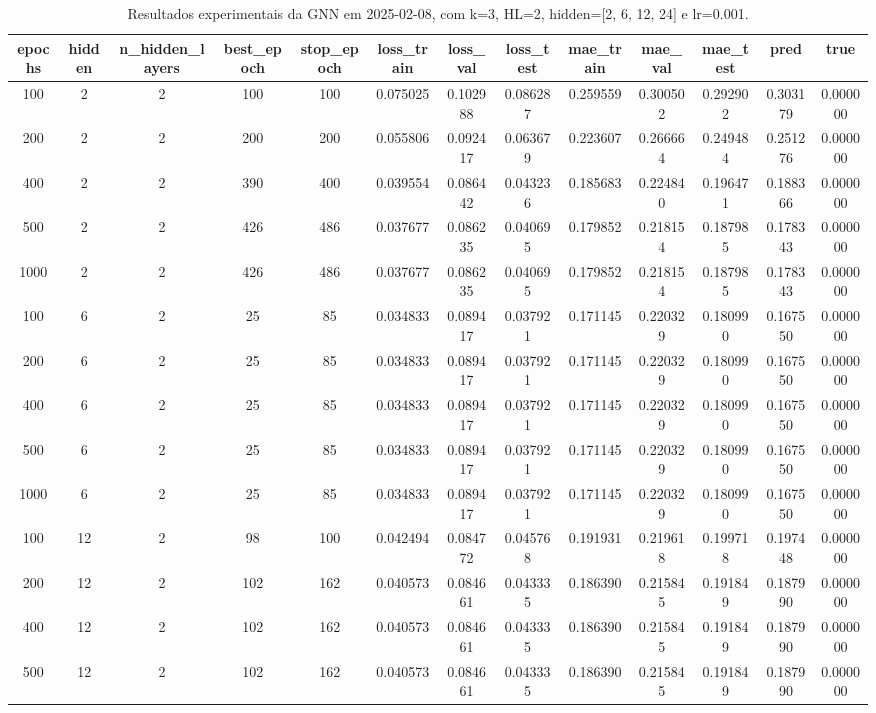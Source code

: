 \begin{table}[h]
\centering
\caption{Resultados experimentais da GNN em 2025-02-08, com k=3, HL=2, hidden=[2, 6, 12, 24] e lr=0.001.}
\label{tab:gnn_results_k3_hl2_d20250208}
\begin{tabular}{ccccccccccccc}
\toprule
epochs & hidden & n\_hidden\_layers & best\_epoch & stop\_epoch & loss\_train & loss\_val & loss\_test & mae\_train & mae\_val & mae\_test & pred & true \\
\midrule
100 & 2 & 2 & 100 & 100 & 0.075025 & 0.102988 & 0.086287 & 0.259559 & 0.300502 & 0.292902 & 0.303179 & 0.000000 \\
200 & 2 & 2 & 200 & 200 & 0.055806 & 0.092417 & 0.063679 & 0.223607 & 0.266664 & 0.249484 & 0.251276 & 0.000000 \\
400 & 2 & 2 & 390 & 400 & 0.039554 & 0.086442 & 0.043236 & 0.185683 & 0.224840 & 0.196471 & 0.188366 & 0.000000 \\
500 & 2 & 2 & 426 & 486 & 0.037677 & 0.086235 & 0.040695 & 0.179852 & 0.218154 & 0.187985 & 0.178343 & 0.000000 \\
1000 & 2 & 2 & 426 & 486 & 0.037677 & 0.086235 & 0.040695 & 0.179852 & 0.218154 & 0.187985 & 0.178343 & 0.000000 \\
100 & 6 & 2 & 25 & 85 & 0.034833 & 0.089417 & 0.037921 & 0.171145 & 0.220329 & 0.180990 & 0.167550 & 0.000000 \\
200 & 6 & 2 & 25 & 85 & 0.034833 & 0.089417 & 0.037921 & 0.171145 & 0.220329 & 0.180990 & 0.167550 & 0.000000 \\
400 & 6 & 2 & 25 & 85 & 0.034833 & 0.089417 & 0.037921 & 0.171145 & 0.220329 & 0.180990 & 0.167550 & 0.000000 \\
500 & 6 & 2 & 25 & 85 & 0.034833 & 0.089417 & 0.037921 & 0.171145 & 0.220329 & 0.180990 & 0.167550 & 0.000000 \\
1000 & 6 & 2 & 25 & 85 & 0.034833 & 0.089417 & 0.037921 & 0.171145 & 0.220329 & 0.180990 & 0.167550 & 0.000000 \\
100 & 12 & 2 & 98 & 100 & 0.042494 & 0.084772 & 0.045768 & 0.191931 & 0.219618 & 0.199718 & 0.197448 & 0.000000 \\
200 & 12 & 2 & 102 & 162 & 0.040573 & 0.084661 & 0.043335 & 0.186390 & 0.215845 & 0.191849 & 0.187990 & 0.000000 \\
400 & 12 & 2 & 102 & 162 & 0.040573 & 0.084661 & 0.043335 & 0.186390 & 0.215845 & 0.191849 & 0.187990 & 0.000000 \\
500 & 12 & 2 & 102 & 162 & 0.040573 & 0.084661 & 0.043335 & 0.186390 & 0.215845 & 0.191849 & 0.187990 & 0.000000 \\

\end{tabular}
\end{table}
